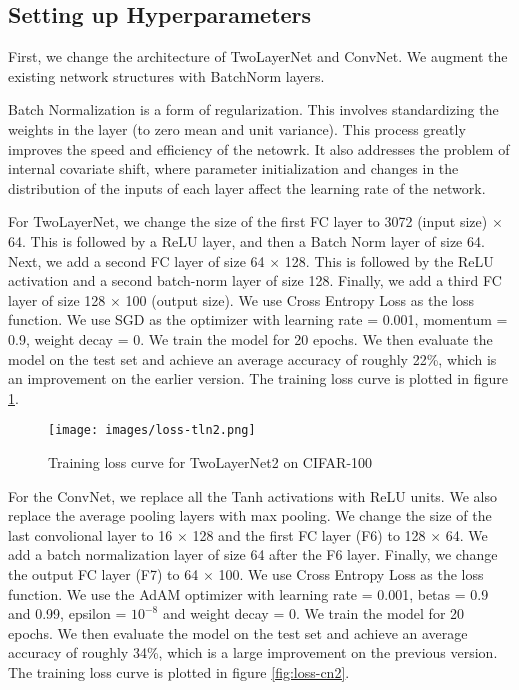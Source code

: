 \documentclass{article}
\begin{document}
\subsection{Setting up Hyperparameters}
\label{sec:hyperparameters}
First, we change the architecture of TwoLayerNet and ConvNet. We augment the existing network structures with BatchNorm layers. 

Batch Normalization is a form of regularization. This involves standardizing the weights in the layer (to zero mean and unit variance). This process greatly improves the speed and efficiency of the netowrk. It also addresses the problem of internal covariate shift, where parameter initialization and changes in the distribution of the inputs of each layer affect the learning rate of the network.

For TwoLayerNet, we change the size of the first FC layer to 3072 (input size) $\times$ 64. This is followed by a ReLU layer, and then a Batch Norm layer of size 64. Next, we add a second FC layer of size 64 $\times$ 128. This is followed by the ReLU activation and a second batch-norm layer of size 128. Finally, we add a third FC layer of size 128 $\times$ 100 (output size). We use Cross Entropy Loss as the loss function. We use SGD as the optimizer with learning rate = 0.001, momentum = 0.9, weight decay = 0. We train the model for 20 epochs. We then evaluate the model on the test set and achieve an average accuracy of roughly 22\%, which is an improvement on the earlier version. The training loss curve is plotted in figure \ref{fig:loss-tln2}.

\begin{figure}[h]
    \centering
    \texttt{[image: images/loss-tln2.png]}
    \caption{Training loss curve for TwoLayerNet2 on CIFAR-100} 
    \label{fig:loss-tln2}
\end{figure}

For the ConvNet, we replace all the Tanh activations with ReLU units. We also replace the average pooling layers with max pooling. We change the size of the last convolional layer to 16 $\times$ 128 and the first FC layer (F6) to 128 $\times$ 64. We add a batch normalization layer of size 64 after the F6 layer. Finally, we change the output FC layer (F7) to 64 $\times$ 100. We use Cross Entropy Loss as the loss function. We use the AdAM optimizer with learning rate = 0.001, betas = 0.9 and 0.99, epsilon = $10^{-8}$ and weight decay = 0. We train the model for 20 epochs. We then evaluate the model on the test set and achieve an average accuracy of roughly 34\%, which is a large improvement on the previous version. The training loss curve is plotted in figure \ref{fig:loss-cn2}.
\end{document}
